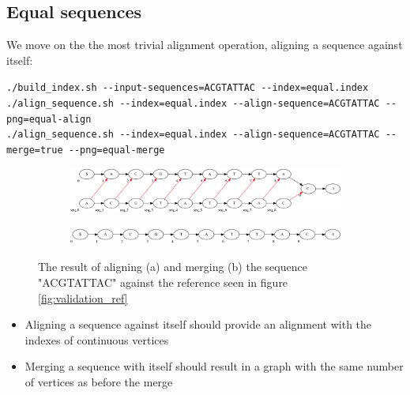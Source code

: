 \documentclass[thesis.tex]{subfiles}
\begin{document}
\subsection*{Equal sequences}
We move on the the most trivial alignment operation, aligning a sequence against itself:\\
\par\noindent
\texttt{./build\_index.sh -{}-input-sequences=ACGTATTAC -{}-index=equal.index}\\
\texttt{./align\_sequence.sh -{}-index=equal.index -{}-align-sequence=ACGTATTAC -{}-png=equal-align}\\
\texttt{./align\_sequence.sh -{}-index=equal.index -{}-align-sequence=ACGTATTAC -{}-merge=true -{}-png=equal-merge}\\
\begin{figure}[!h]
  \begin{mdframed}
  \begin{subfigure}[t]{\textwidth}
      \includegraphics[width=\textwidth]{output/equal-align.png}
    \subcaption{}
  \end{subfigure}
  \begin{subfigure}[t]{\textwidth}
      \includegraphics[width=\textwidth]{output/equal-merge.png}
    \subcaption{}
  \end{subfigure} 
  \end{mdframed}
  \caption{The result of aligning (a) and merging (b) the sequence "ACGTATTAC" against the reference seen in figure \ref{fig:validation_ref}}
  \label{fig:validation_equal}
\end{figure}
\begin{itemize}
\item Aligning a sequence against itself should provide an alignment with the indexes of continuous vertices
\item Merging a sequence with itself should result in a graph with the same number of vertices as before the merge
\end{itemize}
\end{document}
